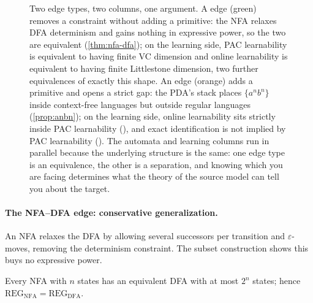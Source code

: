 \begin{figure}[ht]
\caption[Restricts versus extends: conservative equivalences and generative separations]{Two edge types, two columns, one argument. A  edge (green) removes a constraint without adding a primitive: the NFA relaxes DFA determinism and gains nothing in expressive power, so the two are equivalent (\cref{thm:nfa-dfa}); on the learning side, PAC learnability is equivalent to having finite VC dimension and online learnability is equivalent to having finite Littlestone dimension, two further equivalences of exactly this shape. An  edge (orange) adds a primitive and opens a strict gap: the PDA's stack places $\{a^n b^n\}$ inside context-free languages but outside regular languages (\cref{prop:anbn}); on the learning side, online learnability sits strictly inside PAC learnability (), and exact identification is not implied by PAC learnability (). The automata and learning columns run in parallel because the underlying structure is the same: one edge type is an equivalence, the other is a separation, and knowing which you are facing determines what the theory of the source model can tell you about the target.}
\label{fig:restricts-extends}
\end{figure}

\paragraph{The NFA--DFA edge: conservative generalization.}
An NFA relaxes the DFA by allowing several successors per transition and $\varepsilon$-moves, removing the determinism constraint. The subset construction shows this buys no expressive power.

\begin{thm}
\label{thm:nfa-dfa}
Every NFA with $n$ states has an equivalent DFA with at most $2^n$ states; hence $\mathrm{REG}_{\mathrm{NFA}} = \mathrm{REG}_{\mathrm{DFA}}$.
\end{thm}

